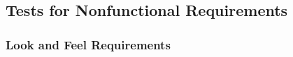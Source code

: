 \documentclass[12pt, titlepage]{article}
\begin{document}
\subsection{Tests for Nonfunctional Requirements} \label{System Tests for Nonfunctional Requirements}




\subsubsection{Look and Feel Requirements}
\end{document}
